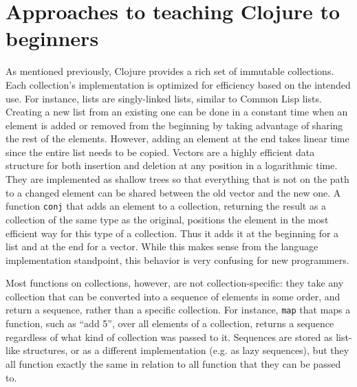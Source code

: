 \documentclass[submission,copyright,creativecommons]{eptcs}
\newcommand{\allcomments}[1]{{#1}}
\newcommand{\todo}[1]{{\bf \color{magenta}{\allcomments{ To-do: {#1}}}}}
\begin{document}

\section{Approaches to teaching Clojure to beginners}\label{sec:approaches}
As mentioned previously, Clojure provides a rich set of immutable collections. Each collection's  implementation  is optimized for efficiency based on the intended use. 
For instance, lists are singly-linked lists, similar to Common Lisp lists. Creating a new list from an existing one can be done in a constant time when an element is added or removed from the beginning by taking advantage of sharing the rest of the elements. %
However, adding an element at the end takes linear time since the entire list needs to be copied. 
Vectors are a highly efficient data structure for both insertion and deletion at any position in a logarithmic time.
They are implemented as shallow trees so that everything that is not on the path to a changed element can be shared between the old vector and the new one.
A function {\tt conj} that adds an element to a collection, returning the result as a collection of the same type as the original, positions the element in the most efficient way for this type of a collection. Thus it adds it at the beginning for a list and at the end for a vector. While this makes sense from the language implementation standpoint, this behavior is very confusing for new programmers. 

Most functions on collections, however, are not collection-specific: they take any collection that can be converted into a sequence of elements in some order, and return a sequence, rather than a specific collection. For instance, {\tt map} that maps a function, such as ``add 5'', over all elements of a collection, returns a sequence regardless of what kind of collection was passed to it. Sequences are stored as list-like structures, or as a different implementation (e.g. as lazy sequences), but they all function exactly the same in relation to all function that they can be passed to. 
\end{document}
